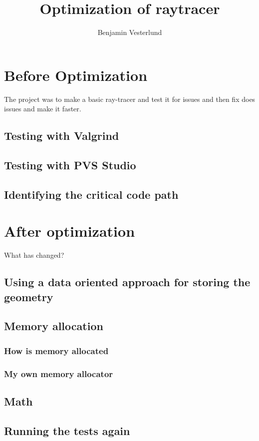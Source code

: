 \documentclass[12pt, %
    ]{fphw}
\title{Optimization of raytracer} %
\author{Benjamin Vesterlund} %
\institute{Luleå University of Technology (LTU)} %
\begin{document}
\maketitle %
\tableofcontents


\section{Before Optimization}

    The project was to make a basic ray-tracer and test it for issues and then fix does issues and make it faster.

\subsection{Testing with Valgrind}

\subsection{Testing with PVS Studio}

\subsection{Identifying the critical code path}


\section{After optimization}
    What has changed?

\subsection{Using a data oriented approach for storing the geometry}
    
\subsection{Memory allocation}
    
\subsubsection{How is memory allocated}
    
\subsubsection{My own memory allocator}
    
\subsection{Math}
    
\subsection{Running the tests again}
    
\end{document}
